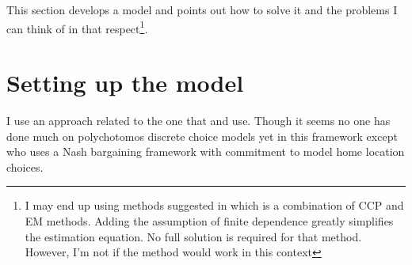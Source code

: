 This section develops a model and points out how to solve it and the problems I can think of in that respect\footnote{I may end up using methods suggested in \cite{ArcidiaconoMiller2011} which is a combination of CCP and EM methods. Adding the assumption of finite dependence greatly simplifies the estimation equation. No full solution is required for that method. However, I'm not if the method would work in this context}.  

\section{Setting up the model}
I use an approach related to the one that \cite{Mazzoccoetal2013} and \cite{Voena2015} use. Though it seems no one has done much on polychotomos discrete choice models yet in this framework except \cite{Gemici2011} who uses a Nash bargaining framework with commitment to model home location choices. 

